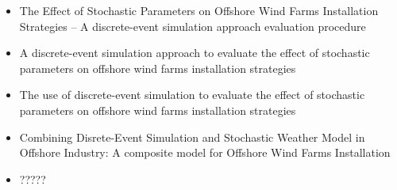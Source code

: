 \begin{titles}
\begin{itemize}
\item The Effect of Stochastic Parameters on Offshore Wind Farms Installation Strategies -- A discrete-event simulation approach evaluation procedure
\item A discrete-event simulation approach to evaluate the effect of stochastic parameters on offshore wind farms installation strategies
\item The use of discrete-event simulation to evaluate the effect of stochastic parameters on offshore wind farms installation strategies
\item Combining Disrete-Event Simulation and Stochastic Weather Model in Offshore Industry: A composite model for Offshore Wind Farms Installation
\item ?????
\end{itemize}
\end{titles}